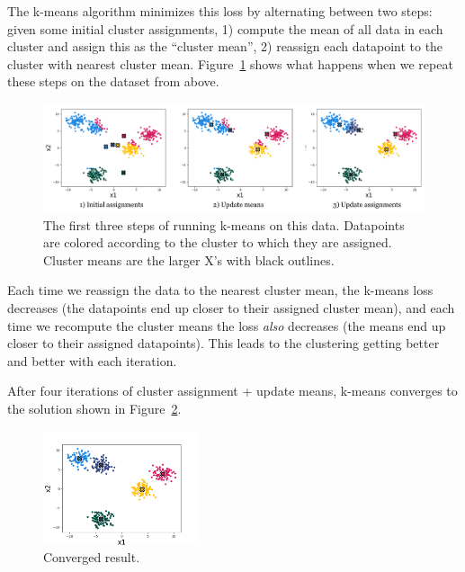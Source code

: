 \documentclass[11pt]{article}
\begin{document}
The k-means algorithm minimizes this loss by alternating between two steps: given some initial cluster assignments, 1) compute the mean of all data in each cluster and assign this as the ``cluster mean'', 2) reassign each datapoint to the cluster with nearest cluster mean. Figure~\ref{fig:kmeans_iters} shows what happens when we repeat these steps on the dataset from above.

\newpage

\begin{figure}[h]
    \centering
    \includegraphics[width=1.0\textwidth]{figures/kmeans_iters.png}
    \caption{The first three steps of running k-means on this data. Datapoints are colored according to the cluster to which they are assigned. Cluster means are the larger X's with black outlines.}
    \label{fig:kmeans_iters}
\end{figure}

Each time we reassign the data to the nearest cluster mean, the k-means loss decreases (the datapoints end up closer to their assigned cluster mean), and each time we recompute the cluster means the loss \textit{also} decreases (the means end up closer to their assigned datapoints). This leads to the clustering getting better and better with each iteration.

After four iterations of cluster assignment + update means, k-means converges to the solution shown in Figure~\ref{fig:kmeans_converged}.
\begin{figure}[h]
    \centering
    \includegraphics[width=0.4\textwidth]{figures/kmeans_fig2_converged.png}
    \caption{Converged result.}
    \label{fig:kmeans_converged}
\end{figure}
\end{document}

